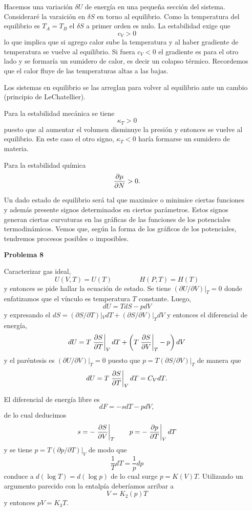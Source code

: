 \documentclass[10pt,oneside]{CBFT_book}
\begin{document}
Hacemos una variación $\delta U$  de energía en una pequeña sección del sistema.
Consideraré la varaición en $\delta S$ en torno al equilibrio.
Como la temperatura del equilibrio es $T_A = T_B$ el $\delta S$ a primer orden
es nulo. La estabilidad exige que
\[
	c_V > 0
\]
lo que implica que si agrego calor sube la temperatura y al haber gradiente de
temperatura se vuelve al equilibrio.
Si fuera $c_V < 0$ el gradiente es para el otro lado y se formaría un sumidero
de calor, es decir un colapso térmico. Recordemos que el calor fluye de las 
temperaturas altas a las bajas.

Los sistemas en equilibrio se las arreglan para volver al equilibrio ante un
cambio (principio de LeChatellier).

Para la estabilidad mecánica se tiene
\[
	\kappa_T > 0
\]
puesto que al aumentar el volumen disminuye la presión y entonces se vuelve al
equilibrio. En este caso el otro signo, $\kappa_T < 0$ haría formarse un
sumidero de materia.

Para la estabilidad química 
\[
	\frac{\partial^{\hspace{-0.05em}} {\mu}}{\partial {N}^{\hspace{-0.05em}}} > 0.
\]

Un dado estado de equilibrio será tal que maximice o minimice ciertas funciones
y además presente signos determinados en ciertos parámetros.
Estos signos generan ciertas curvaturas en las gráficas de las funciones de los
potenciales termodinámicos. Vemos que, según la forma de los gráficos de los
potenciales, tendremos procesos posibles o imposibles.


\begin{ejemplo}{\bf Problema 8}
 
Caracterizar gas ideal, 
\[
	U(V,T) = U(T) \qquad \qquad H(P,T) = H(T)
\]
y entonces se pide hallar la ecuación de estado.
Se tiene $(\partial U / \partial V)|_T = 0$ donde enfatizamos que el vínculo 
es temperatura $T$ constante.
Luego,
\[
	dU = T dS - p dV
\]
y expresando el $ dS = (\partial S / \partial T)|_V dT +
(\partial S / \partial V)|_T dV $ y entonces el diferencial de energía,
\[
	dU = T \left.\frac{\partial^{\hspace{-0.05em}} {S}}{\partial {T}^{\hspace{-0.05em}}}\right|_{V} dT + 
	\left( T \left.\frac{\partial^{\hspace{-0.05em}} {S}}{\partial {V}^{\hspace{-0.05em}}}\right|_{T} - p \right) dV
\]
y el paréntesis es $ (\partial U / \partial V)|_T = 0 $ puesto que 
$ p = T (\partial S / \partial V)|_T $ de manera que 
\[
	dU = T \left.\frac{\partial^{\hspace{-0.05em}} {S}}{\partial {T}^{\hspace{-0.05em}}}\right|_{V} dT = C_V dT .
\]

El diferencial de energía libre es 
\[
	dF = - s dT - p dV,
\]
de lo cual deducimos
\[
	s = -\left.\frac{\partial^{\hspace{-0.05em}} {S}}{\partial {V}^{\hspace{-0.05em}}}\right|_{T} \qquad  p = - \left.\frac{\partial^{\hspace{-0.05em}} {p}}{\partial {T}^{\hspace{-0.05em}}}\right|_{V} dT
\]
y se tiene $ p = T (\partial p / \partial T)|_V $ de modo que 
\[
	\frac{1}{T} dT = \frac{1}{p} dp
\]
conduce a $d(\log T) = d( \log p)$ de lo cual surge $p = K(V) T$.
Utilizando un argumento parecido con la entalpía deberíamos arribar a
\[
	V = K_2(p) T
\]
y entonces $pV = K_3 T$.
 
 
\end{ejemplo}
\end{document}
